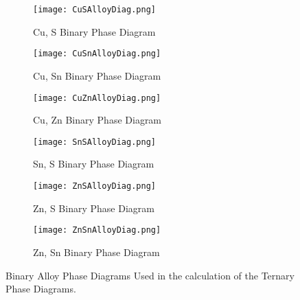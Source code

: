 \begin{figure}[t]
\centering
\begin{subfigure}{70mm}
  \centering
    \texttt{[image: CuSAlloyDiag.png]}
    \caption{Cu, S Binary Phase Diagram\citep{asm_international_asm_1992}}
    \label{fig:CuS}
\end{subfigure}%
\begin{subfigure}{70mm}
 \centering
    \texttt{[image: CuSnAlloyDiag.png]}
    \caption{Cu, Sn Binary Phase Diagram\citep{asm_international_asm_1992}}
    \label{fig:CuSn}
\end{subfigure}
\begin{subfigure}{70mm}
 \centering
    \texttt{[image: CuZnAlloyDiag.png]}
    \caption{Cu, Zn Binary Phase Diagram\citep{asm_international_asm_1992}}
    \label{fig:CuZn}
\end{subfigure}
\begin{subfigure}{70mm}
 \centering
    \texttt{[image: SnSAlloyDiag.png]}
    \caption{Sn, S Binary Phase Diagram\citep{asm_international_asm_1992}}
    \label{fig:SnS}
\end{subfigure}
\begin{subfigure}{70mm}
 \centering
    \texttt{[image: ZnSAlloyDiag.png]}
    \caption{Zn, S Binary Phase Diagram\citep{sharma_s-zn_1996}}
    \label{fig:ZnS}
\end{subfigure}
\begin{subfigure}{70mm}
 \centering
    \texttt{[image: ZnSnAlloyDiag.png]}
    \caption{Zn, Sn Binary Phase Diagram\citep{asm_international_asm_1992}}
    \label{fig:ZnSn}
\end{subfigure}
\caption{Binary Alloy Phase Diagrams Used in the calculation of the Ternary Phase Diagrams.}
\label{fig:BinaryAlloyPhaseDiagrams}
\end{figure}